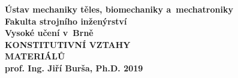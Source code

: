\documentclass[a4paper, 12pt, oneside]{report}
\numberwithin{equation}{part}
\begin{document}
\begin{titlepage}
\pagecolor{fsimodra}
\color{white}
\renewcommand{\thepage}{cover}
\centering
\bfseries
{Ústav mechaniky těles, biomechaniky a~mechatroniky\\Fakulta strojního inženýrství\\Vysoké učení v~Brně\\}
\vfill
{\Huge KONSTITUTIVNÍ VZTAHY\\MATERIÁLŮ\\}
\vfill
{\LARGE prof. Ing. Jiří Burša, Ph.D.}
\vfill
2019
\end{titlepage}

\clearpage
\nopagecolor
\color{black}
\clearpage
{}





\appendix

\end{document}
